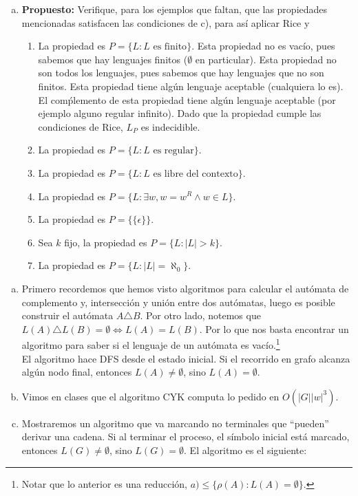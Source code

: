 \documentclass[dcc]{fcfmcourse}
\begin{document}
\begin{problems}
\begin{enumerate}[a)]
     \item \textbf{Propuesto:} Verifique, para los ejemplos que faltan, que las propiedades mencionadas satisfacen las condiciones de c), para así aplicar Rice y 
     \begin{enumerate}[1.]
         \item La propiedad es $P = \{L\colon L \text{ es finito}\}$. Esta propiedad no es vacío, pues sabemos que hay lenguajes finitos ($\emptyset$ en particular). Esta propiedad no son todos los lenguajes, pues sabemos que hay lenguajes que no son finitos. Esta propiedad tiene algún lenguaje aceptable (cualquiera lo es). El comṕlemento de esta propiedad tiene algún lenguaje aceptable (por ejemplo alguno regular infinito). Dado que la propiedad cumple las condiciones de Rice, $L_{P}$ es indecidible.
         \item  La propiedad es $P = \{L\colon L \text{ es regular}\}$.
         \item  La propiedad es $P = \{L\colon L \text{ es libre del contexto}\}$.
         \item  La propiedad es $P = \{L\colon \exists w, w = w^R \land w\in L\}$.
         \item  La propiedad es $P = \{\{\epsilon\}\}$.
         \item Sea $k$ fijo, la propiedad es $P = \{L\colon |L|>k\}$.
         \item La propiedad es $P = \{L\colon |L|= \aleph_{0}\}$.
     \end{enumerate}
 \end{enumerate}
 \problem \begin{enumerate} [a)]
 \item Primero recordemos que hemos visto algoritmos para calcular el autómata de complemento y, intersección y unión entre dos autómatas, luego es posible construir el autómata $A \triangle B$. Por otro lado, notemos que $L(A)\triangle L(B) = \emptyset \Leftrightarrow L(A) = L(B)$. Por lo que nos basta encontrar un algoritmo para saber si el lenguaje de un autómata es vacío.\footnote{Notar que lo anterior es una reducción, $a) \le \{\rho(A)\colon L(A) = \emptyset\}$.}\\
 El algoritmo hace DFS desde el estado inicial. Si el recorrido en grafo alcanza algún nodo final, entonces $L(A) \not = \emptyset$, sino $L(A) = \emptyset$.
 \item Vimos en clases que el algoritmo CYK computa lo pedido en $O(|G||w|^3)$.
 \item Mostraremos un algoritmo que va marcando no terminales que ``pueden'' derivar una cadena. Si al terminar el proceso, el símbolo inicial está marcado, entonces $L(G) \not = \emptyset$, sino $L(G) = \emptyset$. El algoritmo es el siguiente:

\end{enumerate}
\end{problems}
\end{document}
